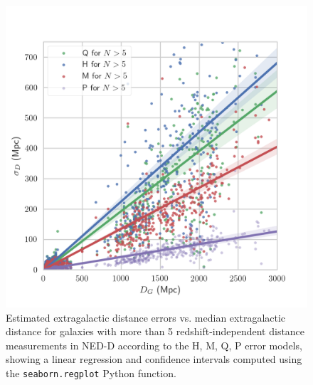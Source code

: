 \documentclass[a4paper,fleqn,usenatbib]{mnras}
\begin{document}
\begin{figure}
	\includegraphics[scale=0.7]{Nhigh.png}
    \caption{Estimated extragalactic distance errors vs. median extragalactic distance for galaxies with more than 5 redshift-independent distance measurements in NED-D according to the H, M, Q, P error models, showing a linear regression and confidence intervals computed using the \texttt{seaborn.regplot} Python function.}
    \label{fig:Nhigh}
\end{figure}




\bsp	%
\label{lastpage}
\end{document}
